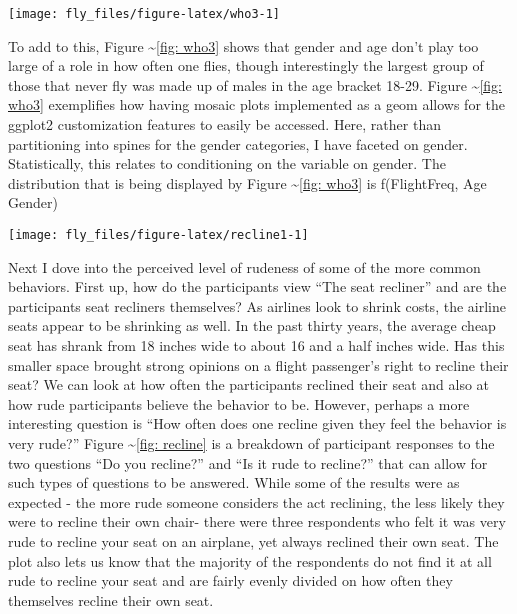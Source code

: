 \begin{Schunk}


\begin{center}\texttt{[image: fly\_files/figure-latex/who3-1]} \end{center}

\end{Schunk}

To add to this, Figure \textasciitilde{}\ref{fig: who3} shows that
gender and age don't play too large of a role in how often one flies,
though interestingly the largest group of those that never fly was made
up of males in the age bracket 18-29. Figure
\textasciitilde{}\ref{fig: who3} exemplifies how having mosaic plots
implemented as a geom allows for the ggplot2 customization features to
easily be accessed. Here, rather than partitioning into spines for the
gender categories, I have faceted on gender. Statistically, this relates
to conditioning on the variable on gender. The distribution that is
being displayed by Figure \textasciitilde{}\ref{fig: who3} is
f(FlightFreq, Age \textbar{}Gender)

\begin{Schunk}


\begin{center}\texttt{[image: fly\_files/figure-latex/recline1-1]} \end{center}

\end{Schunk}

Next I dove into the perceived level of rudeness of some of the more
common behaviors. First up, how do the participants view ``The seat
recliner'' and are the participants seat recliners themselves? As
airlines look to shrink costs, the airline seats appear to be shrinking
as well. In the past thirty years, the average cheap seat has shrank
from 18 inches wide to about 16 and a half inches wide. \citet{washpost}
Has this smaller space brought strong opinions on a flight passenger's
right to recline their seat? We can look at how often the participants
reclined their seat and also at how rude participants believe the
behavior to be. However, perhaps a more interesting question is ``How
often does one recline given they feel the behavior is very rude?''
Figure \textasciitilde{}\ref{fig: recline} is a breakdown of participant
responses to the two questions ``Do you recline?'' and ``Is it rude to
recline?'' that can allow for such types of questions to be answered.
While some of the results were as expected - the more rude someone
considers the act reclining, the less likely they were to recline their
own chair- there were three respondents who felt it was very rude to
recline your seat on an airplane, yet always reclined their own seat.
The plot also lets us know that the majority of the respondents do not
find it at all rude to recline your seat and are fairly evenly divided
on how often they themselves recline their own seat.

